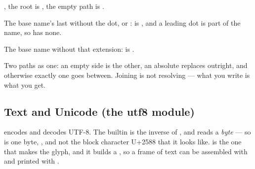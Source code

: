 \begin{description}[style=nextline,leftmargin=5.2em]
  , the root is , the empty path is .
\item[\ic{fs.path\_extension(path)}] The base name's last
   without the dot, or :  is , and a
  leading dot is part of the name, so  has none.
\item[\ic{fs.path\_stem(path)}] The base name without that extension:
   is .
\item[\ic{fs.path\_join(a, b)}] Two paths as one: an empty side is the
  other, an absolute  replaces  outright, and otherwise exactly
  one \ic{/} goes between. Joining is not resolving --- what you write is
  what you get.
\end{description}

\subsection{Text and Unicode (the utf8 module)}
\label{sec:builtin-utf8}

 encodes and decodes UTF-8. The builtin  is the
inverse of , and  reads a \emph{byte} --- so
 is one byte, , and not the block character
U+2588 that it looks like.  is the one that makes the glyph,
and it builds a , so a frame of text can be assembled with
\ic{+=} and printed with .


